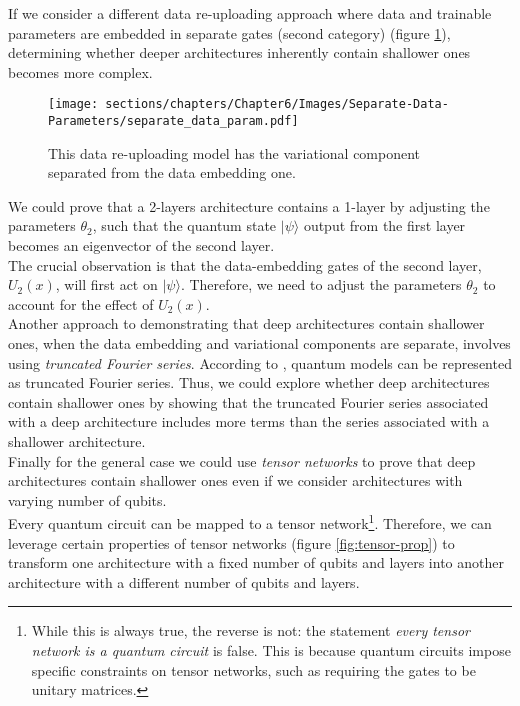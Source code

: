 \begin{itemize}
    If we consider a different data re-uploading approach where data and trainable parameters are 
    embedded in separate gates (second category) (figure \ref{fig:separate-data-var}), 
    determining whether deeper architectures inherently contain shallower ones becomes more complex.

    \begin{figure}[h]
        \centering
        \texttt{[image: sections/chapters/Chapter6/Images/Separate-Data-Parameters/separate\_data\_param.pdf]}
    \caption{This data re-uploading model has the variational component separated from the data embedding one.}
    \label{fig:separate-data-var}
    \end{figure}

    We could prove that a 2-layers architecture contains a 1-layer by adjusting the parameters $\theta_2$, 
    such that the quantum state $|\psi \rangle$ output from the first layer becomes an eigenvector 
    of the second layer.\\
    The crucial observation is that the data-embedding gates of the second layer, $U_2(x)$, 
    will first act on $|\psi \rangle$. Therefore, we need to adjust the parameters $\theta_2$ 
    to account for the effect of $U_2(x)$.\\

    Another approach to demonstrating that deep architectures contain shallower ones, when the data 
    embedding and variational components are separate, involves using \textit{truncated Fourier series}. 
    According to \cite{Schuld_2021}, quantum models can be represented as truncated Fourier series. 
    Thus, we could explore whether deep architectures contain shallower ones by showing that the 
    truncated Fourier series associated with a deep architecture includes more terms than the series 
    associated with a shallower architecture.\\

    Finally for the general case we could use \textit{tensor networks} to prove that deep 
    architectures contain shallower ones even if we consider architectures with varying number of 
    qubits.\\
    Every quantum circuit can be mapped to a tensor network\footnote[3]{While this is 
    always true, the reverse is not: the statement \textit{every tensor network is a quantum 
    circuit} is false. This is because quantum circuits impose specific constraints on tensor 
    networks, such as requiring the gates to be unitary matrices.}. Therefore, we can leverage 
    certain properties of tensor networks (figure \ref{fig:tensor-prop}) to transform one architecture with a fixed number of 
    qubits and layers into another architecture with a different number of qubits and layers.


\end{itemize}
